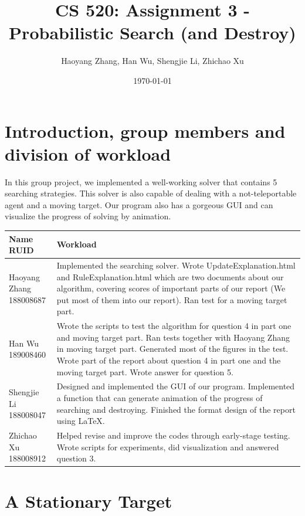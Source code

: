 \documentclass[letter]{article}
\title{CS 520: Assignment 3 - Probabilistic Search (and Destroy)}
\author{Haoyang Zhang, Han Wu, Shengjie Li, Zhichao Xu}
\date{\today}
\begin{document}
\maketitle

\section{Introduction, group members and division of workload}
\label{sec:Introduction}

In this group project, we implemented a well-working solver that contains 5 searching strategies. This solver is also capable of dealing with a not-teleportable agent and a moving target. Our program also has a gorgeous GUI and can visualize the progress of solving by animation. \\
\begin{tabular}{| p{2.5cm} | p{\textwidth -3.5cm} |}
	\hline
	\makecell[c]{Name \\ RUID} & Workload \\
	\hline
	\makecell[c]{Haoyang Zhang \\ 188008687} & {Implemented the searching solver. Wrote UpdateExplanation.html and RuleExplanation.html which are two documents about our algorithm, covering scores of important parts of our report (We put most of them into our report). Ran test for a moving target part.} \\
	\hline
	\makecell[c]{Han Wu \\ 189008460} & {Wrote the scripts to test the algorithm for question 4 in part one and moving target part. Ran tests together with Haoyang Zhang in moving target part. Generated most of the figures in the test. Wrote part of the report about question 4 in part one and the moving target part. Wrote answer for question 5.} \\
	\hline
	\makecell[c]{Shengjie Li \\ 188008047} & {Designed and implemented the GUI of our program. Implemented a function that can generate animation of the progress of searching and destroying. Finished the format design of the report using \LaTeX. } \\
	\hline
	\makecell[c]{Zhichao Xu \\ 188008912} & {Helped revise and improve the codes through early-stage testing. Wrote scripts for experiments, did visualization and answered question 3.} \\
	\hline
\end{tabular}


\section{A Stationary Target}
\label{sec:A Stationary Target}
\end{document}
